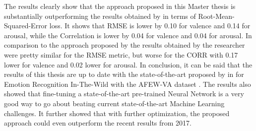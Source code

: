 The results clearly show that the approach proposed in this Master thesis is substantially outperforming the results obtained by \citet{Kossaifi:2017:AFEW-VADatabase} in terms of Root-Mean-Squared-Error loss. It shows that RMSE is lower by 0.10 for valence and 0.14 for arousal, while the Correlation is lower by 0.04 for valence and 0.04 for arousal. In comparison to the approach proposed by \citet{Handrich:2020:SimultaneousPredVA} the results obtained by the researcher were pretty similar for the RMSE metric, but worse for the CORR with 0.17 lower for valence and 0.02 lower for arousal.
\newline\newline
In conclusion, it can be said that the results of this thesis are up to date with the state-of-the-art proposed by \citet{Handrich:2020:SimultaneousPredVA} in \citeyear{Handrich:2020:SimultaneousPredVA} for Emotion Recognition In-The-Wild with the AFEW-VA dataset \citep{Kossaifi:2017:AFEW-VADatabase}. The results also showed that fine-tuning a state-of-the-art pre-trained Neural Network is a very good way to go about beating current state-of-the-art Machine Learning challenges. It further showed that with further optimization, the proposed approach could even outperform the recent results from 2017.

